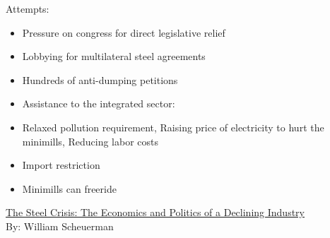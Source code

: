 \documentclass[10pt]{article}
\begin{document}
\normalsize Attempts:
\begin{itemize}
  \item Pressure on congress for direct legislative relief
  \item Lobbying for multilateral steel agreements
  \item Hundreds of anti-dumping petitions
  \item Assistance to the integrated sector:
  \item Relaxed pollution requirement, Raising price of electricity to hurt the minimills, Reducing labor costs
  \item Import restriction
	\item Minimills can freeride
\end{itemize}

\normalsize\underline{The Steel Crisis: The Economics and Politics of a Declining Industry}\\
\normalsize By: William Scheuerman
\end{document}
